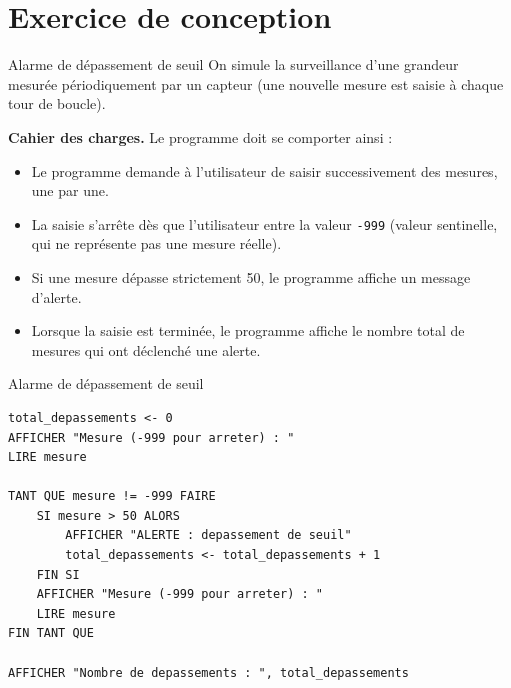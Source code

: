 \section{Exercice de conception}

\begin{UPSTIexercice}{Alarme de dépassement de seuil}
    On simule la surveillance d'une grandeur mesurée périodiquement par un capteur (une nouvelle mesure est saisie à chaque tour de boucle).

    \textbf{Cahier des charges.} Le programme doit se comporter ainsi :
    \begin{itemize}
        \item Le programme demande à l'utilisateur de saisir successivement des mesures, une par une.
        \item La saisie s'arrête dès que l'utilisateur entre la valeur \texttt{-999} (valeur sentinelle, qui ne représente pas une mesure réelle).
        \item Si une mesure dépasse strictement 50, le programme affiche un message d'alerte.
        \item Lorsque la saisie est terminée, le programme affiche le nombre total de mesures qui ont déclenché une alerte.
    \end{itemize}

\end{UPSTIexercice}

\begin{UPSTIprofOnlyEnv}
    \begin{UPSTIcorrectionP}{Alarme de dépassement de seuil}
        \begin{verbatim}
total_depassements <- 0
AFFICHER "Mesure (-999 pour arreter) : "
LIRE mesure

TANT QUE mesure != -999 FAIRE
    SI mesure > 50 ALORS
        AFFICHER "ALERTE : depassement de seuil"
        total_depassements <- total_depassements + 1
    FIN SI
    AFFICHER "Mesure (-999 pour arreter) : "
    LIRE mesure
FIN TANT QUE

AFFICHER "Nombre de depassements : ", total_depassements
        \end{verbatim}
    \end{UPSTIcorrectionP}
\end{UPSTIprofOnlyEnv}

